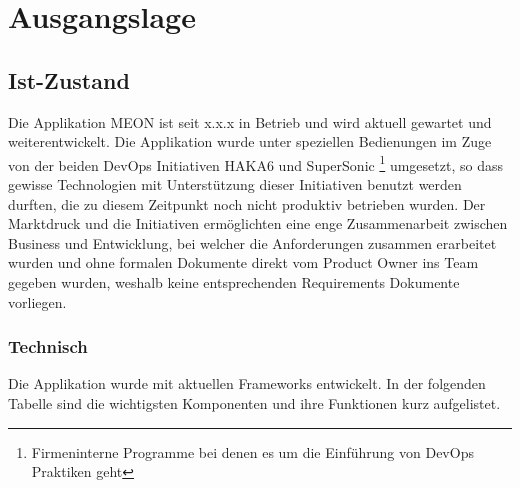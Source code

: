 \graphicspath{{./images/}}

\chapter{Ausgangslage}

\section{Ist-Zustand}

Die Applikation MEON ist seit x.x.x in Betrieb und wird aktuell gewartet und weiterentwickelt. Die Applikation wurde unter speziellen Bedienungen im Zuge von der beiden DevOps Initiativen HAKA6 und SuperSonic \footnote{Firmeninterne Programme bei denen es um die Einführung von DevOps Praktiken geht} umgesetzt, so dass gewisse Technologien mit Unterstützung dieser Initiativen benutzt werden durften, die zu diesem Zeitpunkt noch nicht produktiv betrieben wurden. Der Marktdruck und die Initiativen ermöglichten eine enge Zusammenarbeit zwischen Business und Entwicklung, bei welcher die Anforderungen zusammen erarbeitet wurden und ohne formalen Dokumente direkt vom Product Owner ins Team gegeben wurden, weshalb keine entsprechenden Requirements Dokumente vorliegen.
\newpage
\subsection{Technisch}

Die Applikation wurde mit aktuellen Frameworks entwickelt. In der folgenden Tabelle sind die wichtigsten Komponenten und ihre Funktionen kurz aufgelistet.

